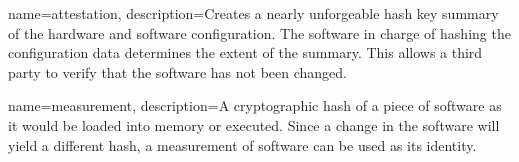 {
        name=attestation,
        description={Creates a nearly unforgeable hash key summary of the hardware and software configuration. The software in charge of hashing the configuration data determines the extent of the summary. This allows a third party to verify that the software has not been changed.}
}

{
        name=measurement,
        description={A cryptographic hash of a piece of software as it would be loaded into memory or executed. Since a change in the software will yield a different hash, a measurement of software can be used as its identity.}
}